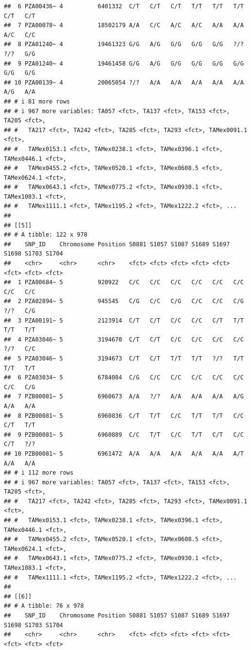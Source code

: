 \documentclass[
]{article}
\begin{document}
\begin{verbatim}
##  6 PZA00436~ 4          6401332  C/T   C/T   C/T   T/T   T/T   T/T   C/T   C/T  
##  7 PZA00078~ 4          18502179 A/A   C/C   A/C   A/C   A/A   A/A   A/C   C/C  
##  8 PZA01240~ 4          19461323 G/G   A/G   G/G   G/G   G/G   ?/?   ?/?   G/G  
##  9 PZA01240~ 4          19461458 G/G   A/G   G/G   G/G   G/G   G/G   G/G   G/G  
## 10 PZA00139~ 4          20065054 ?/?   A/A   A/A   A/A   A/A   A/A   A/G   A/A  
## # i 81 more rows
## # i 967 more variables: TA057 <fct>, TA137 <fct>, TA153 <fct>, TA205 <fct>,
## #   TA217 <fct>, TA242 <fct>, TA285 <fct>, TA293 <fct>, TAMex0091.1 <fct>,
## #   TAMex0153.1 <fct>, TAMex0238.1 <fct>, TAMex0396.1 <fct>, TAMex0446.1 <fct>,
## #   TAMex0455.2 <fct>, TAMex0520.1 <fct>, TAMex0608.5 <fct>, TAMex0624.1 <fct>,
## #   TAMex0643.1 <fct>, TAMex0775.2 <fct>, TAMex0930.1 <fct>, TAMex1083.1 <fct>,
## #   TAMex1111.1 <fct>, TAMex1195.2 <fct>, TAMex1222.2 <fct>, ...
## 
## [[5]]
## # A tibble: 122 x 978
##    SNP_ID    Chromosome Position S0881 S1057 S1087 S1689 S1697 S1698 S1703 S1704
##    <chr>     <chr>      <chr>    <fct> <fct> <fct> <fct> <fct> <fct> <fct> <fct>
##  1 PZA00684~ 5          920922   C/C   C/C   C/C   C/C   C/C   C/C   C/C   C/C  
##  2 PZA02894~ 5          945545   C/G   C/C   C/G   C/C   C/C   C/G   ?/?   C/G  
##  3 PZA00191~ 5          2123914  C/T   C/T   C/C   C/C   C/T   T/T   T/T   T/T  
##  4 PZA03046~ 5          3194670  C/T   C/T   C/C   C/C   C/C   C/C   ?/?   C/C  
##  5 PZA03046~ 5          3194673  C/T   C/T   T/T   T/T   ?/?   T/T   T/T   T/T  
##  6 PZA03034~ 5          6784084  C/G   C/C   C/C   C/C   C/C   C/C   C/C   C/G  
##  7 PZB00081~ 5          6960673  A/A   ?/?   A/A   A/A   A/A   A/G   A/A   A/A  
##  8 PZB00081~ 5          6960836  C/T   T/T   C/C   T/T   T/T   C/C   C/T   T/T  
##  9 PZB00081~ 5          6960889  C/C   T/T   C/C   T/T   C/T   C/C   C/T   ?/?  
## 10 PZB00081~ 5          6961472  A/A   A/A   A/A   A/A   A/A   A/T   A/A   A/A  
## # i 112 more rows
## # i 967 more variables: TA057 <fct>, TA137 <fct>, TA153 <fct>, TA205 <fct>,
## #   TA217 <fct>, TA242 <fct>, TA285 <fct>, TA293 <fct>, TAMex0091.1 <fct>,
## #   TAMex0153.1 <fct>, TAMex0238.1 <fct>, TAMex0396.1 <fct>, TAMex0446.1 <fct>,
## #   TAMex0455.2 <fct>, TAMex0520.1 <fct>, TAMex0608.5 <fct>, TAMex0624.1 <fct>,
## #   TAMex0643.1 <fct>, TAMex0775.2 <fct>, TAMex0930.1 <fct>, TAMex1083.1 <fct>,
## #   TAMex1111.1 <fct>, TAMex1195.2 <fct>, TAMex1222.2 <fct>, ...
## 
## [[6]]
## # A tibble: 76 x 978
##    SNP_ID    Chromosome Position S0881 S1057 S1087 S1689 S1697 S1698 S1703 S1704
##    <chr>     <chr>      <chr>    <fct> <fct> <fct> <fct> <fct> <fct> <fct> <fct>

\end{verbatim}
\end{document}
